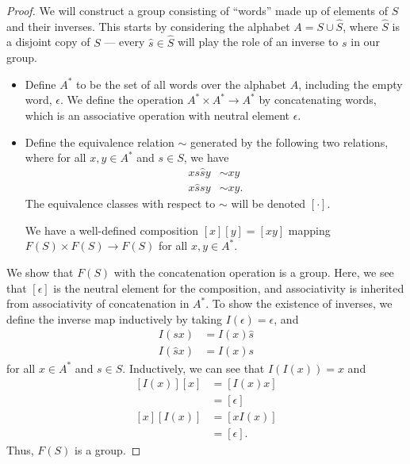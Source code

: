 \begin{proof}
  We will construct a group consisting of ``words'' made up of elements of $S$ and their inverses. This starts by considering the alphabet $A = S\cup \widehat{S}$, where $\widehat{S}$ is a disjoint copy of $S$ --- every $\hat{s}\in \widehat{S}$ will play the role of an inverse to $s$ in our group.
  \begin{itemize}
    \item Define $A^{\ast}$ to be the set of all words over the alphabet $A$, including the empty word, $\epsilon$. We define the operation $A^{\ast}\times A^{\ast}\rightarrow A^{\ast}$ by concatenating words, which is an associative operation with neutral element $\epsilon$.
    \item Define the equivalence relation $\sim$ generated by the following two relations, where for all $x,y\in A^{\ast}$ and $s\in S$, we have
      \begin{align*}
        xs\hat{s}y &\sim xy\\
        x\hat{s}sy &\sim xy.
      \end{align*}
      The equivalence classes with respect to $\sim$ will be denoted $\left[\cdot\right]$.\newline

      We have a well-defined composition $\left[x\right]\left[y\right] = \left[xy\right]$ mapping $F(S) \times F(S) \rightarrow F(S)$ for all $x,y\in A^{\ast}$.
  \end{itemize}
  We show that $F(S)$ with the concatenation operation is a group. Here, we see that $\left[\epsilon\right]$ is the neutral element for the composition, and associativity is inherited from associativity of concatenation in $A^{\ast}$. To show the existence of inverses, we define the inverse map inductively by taking $I\left(\epsilon\right) = \epsilon$, and
  \begin{align*}
    I\left(sx\right) &= I(x)\hat{s}\\
    I\left(\hat{s}x\right) &= I(x)s
  \end{align*}
  for all $x\in A^{\ast}$  and $s\in S$. Inductively, we can see that $I\left(I\left(x\right)\right) = x$ and
  \begin{align*}
    \left[I(x)\right]\left[x\right] &= \left[I(x)x\right]\\
                                    &= \left[\epsilon\right]\\
    \left[x\right]\left[I(x)\right] &= \left[xI(x)\right]\\
                                    &= \left[\epsilon\right].
  \end{align*}
  Thus, $F(S)$ is a group.\newline


\end{proof}
